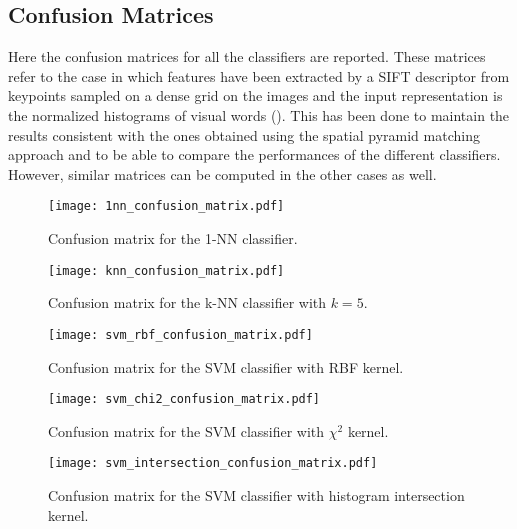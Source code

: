 \documentclass[../main.tex]{subfiles}
\begin{document}
\pagebreak
\subsection{Confusion Matrices}\label{app:confusion-matrices}

Here the confusion matrices for all the classifiers are reported. These matrices
refer to the case in which features have been extracted by a SIFT descriptor
from keypoints sampled on a dense grid on the images and the input
representation is the normalized histograms of visual words (). This has been done to maintain the results consistent with the ones obtained using the spatial pyramid matching approach and to be able to compare the performances of the different classifiers. However, similar matrices can be computed in the other cases as well.\\

\begin{figure}[htb]
  \centering
  \texttt{[image: 1nn\_confusion\_matrix.pdf]}
  \caption{Confusion matrix for the 1-NN classifier.}\label{fig:confusion-matrix-1nn}
\end{figure}

\begin{figure}[htb]
  \centering
  \texttt{[image: knn\_confusion\_matrix.pdf]}
  \caption{Confusion matrix for the k-NN classifier with $k = 5$.}\label{fig:confusion-matrix-knn}
\end{figure}

\begin{figure}[htb]
  \centering
  \texttt{[image: svm\_rbf\_confusion\_matrix.pdf]}
  \caption{Confusion matrix for the SVM classifier with RBF kernel.}\label{fig:confusion-matrix-rbf}
\end{figure}

\begin{figure}[htb]
  \centering
  \texttt{[image: svm\_chi2\_confusion\_matrix.pdf]}
  \caption{Confusion matrix for the SVM classifier with $\chi^2$ kernel.}\label{fig:confusion-matrix-chi2}
\end{figure}

\begin{figure}[htb]
  \centering
  \texttt{[image: svm\_intersection\_confusion\_matrix.pdf]}
  \caption{Confusion matrix for the SVM classifier with histogram intersection kernel.}\label{fig:confusion-matrix-intersection}
\end{figure}
\end{document}

